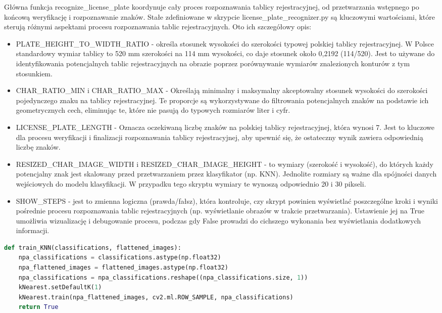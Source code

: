 \documentclass[12pt,a4paper,oneside]{article}
\theoremstyle{definition}
\numberwithin{equation}{section}
\begin{document}
Główna funkcja recognize{\_}license{\_}plate koordynuje cały proces rozpoznawania tablicy rejestracyjnej, od przetwarzania wstępnego po końcową weryfikację i rozpoznawanie znaków. Stałe zdefiniowane w skrypcie license{\_}plate{\_}recognizer.py są kluczowymi wartościami, które sterują różnymi aspektami procesu rozpoznawania tablic rejestracyjnych. Oto ich szczegółowy opis:

\begin{itemize}
  \item PLATE{\_}HEIGHT{\_}TO{\_}WIDTH{\_}RATIO - określa stosunek wysokości do szerokości typowej polskiej tablicy rejestracyjnej. W Polsce standardowy wymiar tablicy to 520 mm szerokości na 114 mm wysokości, co daje stosunek około 0,2192 (114/520). Jest to używane do identyfikowania potencjalnych tablic rejestracyjnych na obrazie poprzez porównywanie wymiarów znalezionych konturów z tym stosunkiem.
  \item CHAR{\_}RATIO{\_}MIN i CHAR{\_}RATIO{\_}MAX - Określają minimalny i maksymalny akceptowalny stosunek wysokości do szerokości pojedynczego znaku na tablicy rejestracyjnej. Te proporcje są wykorzystywane do filtrowania potencjalnych znaków na podstawie ich geometrycznych cech, eliminując te, które nie pasują do typowych rozmiarów liter i cyfr.
  \item LICENSE{\_}PLATE{\_}LENGTH - Oznacza oczekiwaną liczbę znaków na polskiej tablicy rejestracyjnej, która wynosi 7. Jest to kluczowe dla procesu weryfikacji i finalizacji rozpoznawania tablicy rejestracyjnej, aby upewnić się, że ostateczny wynik zawiera odpowiednią liczbę znaków.
  \item RESIZED{\_}CHAR{\_}IMAGE{\_}WIDTH i RESIZED{\_}CHAR{\_}IMAGE{\_}HEIGHT - to wymiary (szerokość i wysokość), do których każdy potencjalny znak jest skalowany przed przetwarzaniem przez klasyfikator (np. KNN). Jednolite rozmiary są ważne dla spójności danych wejściowych do modelu klasyfikacji. W przypadku tego skryptu wymiary te wynoszą odpowiednio 20 i 30 pikseli.
  \item SHOW{\_}STEPS - jest to zmienna logiczna (prawda/fałsz), która kontroluje, czy skrypt powinien wyświetlać poszczególne kroki i wyniki pośrednie procesu rozpoznawania tablic rejestracyjnych (np. wyświetlanie obrazów w trakcie przetwarzania). Ustawienie jej na True umożliwia wizualizację i debugowanie procesu, podczas gdy False prowadzi do cichszego wykonania bez wyświetlania dodatkowych informacji.
\end{itemize}

\begin{adjustbox}{max width=\textwidth}
\begin{lstlisting}[language=Python]
def train_KNN(classifications, flattened_images):
    npa_classifications = classifications.astype(np.float32)
    npa_flattened_images = flattened_images.astype(np.float32)
    npa_classifications = npa_classifications.reshape((npa_classifications.size, 1))
    kNearest.setDefaultK(1)
    kNearest.train(npa_flattened_images, cv2.ml.ROW_SAMPLE, npa_classifications)
    return True
\end{lstlisting} 
\end{adjustbox}
\end{document}
